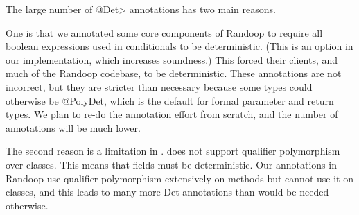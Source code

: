 The large number of \<@Det> annotations has two main reasons.

One is that we annotated some core components of Randoop to require all
boolean expressions used in conditionals to be deterministic.  (This is an
option in our implementation, which increases soundness.)  This forced
their clients, and much of the Randoop codebase, to be deterministic.
These annotations are not incorrect, but they are stricter than necessary
because some types could otherwise be @PolyDet, which is the default for
formal parameter and return types.  We plan to re-do the annotation effort
from scratch, and the number of annotations will be much lower.

The second reason is a limitation in \theDeterminismCheckerImplementation.
\TheDeterminismChecker does not support qualifier polymorphism over
classes.  This means that fields must be deterministic.  Our annotations in
Randoop use qualifier polymorphism extensively on methods but cannot use it
on classes, and this leads to many more Det annotations than would be
needed otherwise.
